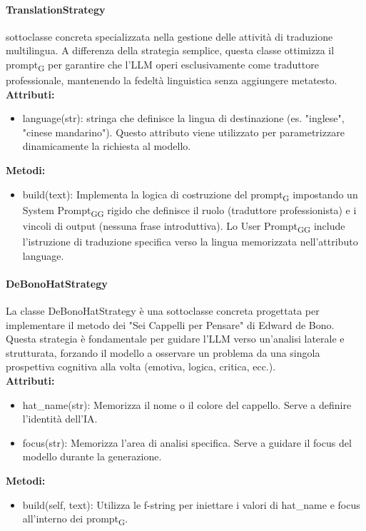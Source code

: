 \documentclass[11pt,a4paper]{article}
\newcommand{\gls}[1]{#1\textsubscript{G}}
\begin{document}
\paragraph{TranslationStrategy} 
sottoclasse concreta specializzata nella gestione delle attività di traduzione multilingua. A differenza della strategia semplice, questa classe ottimizza il \gls{prompt} per garantire che l'LLM operi esclusivamente come traduttore professionale, mantenendo la fedeltà linguistica senza aggiungere metatesto.
\\ \textbf{Attributi:}
\begin{itemize}
    \item language(str): stringa che definisce la lingua di destinazione (es. "inglese", "cinese mandarino"). Questo attributo viene utilizzato per parametrizzare dinamicamente la richiesta al modello.
\end{itemize}
\textbf{Metodi:}
\begin{itemize}
    \item build(text): Implementa la logica di costruzione del \gls{prompt} impostando un \gls{System \gls{Prompt}} rigido che definisce il ruolo (traduttore professionista) e i vincoli di output (nessuna frase introduttiva). Lo \gls{User \gls{Prompt}} include l'istruzione di traduzione specifica verso la lingua memorizzata nell'attributo language.
\end{itemize}

\paragraph{DeBonoHatStrategy}
La classe DeBonoHatStrategy è una sottoclasse concreta progettata per implementare il metodo dei "Sei Cappelli per Pensare" di Edward de Bono. Questa strategia è fondamentale per guidare l'LLM verso un'analisi laterale e strutturata, forzando il modello a osservare un problema da una singola prospettiva cognitiva alla volta (emotiva, logica, critica, ecc.).
\\ \textbf{Attributi:}
\begin{itemize}
    \item hat\_name(str): Memorizza il nome o il colore del cappello. Serve a definire l'identità dell'IA.
    \item focus(str): Memorizza l'area di analisi specifica. Serve a guidare il focus del modello durante la generazione.
\end{itemize}
\textbf{Metodi:}
\begin{itemize}
    \item build(self, text): Utilizza le f-string per iniettare i valori di hat\_name e focus all'interno dei \gls{prompt}.
\end{itemize}
\end{document}
